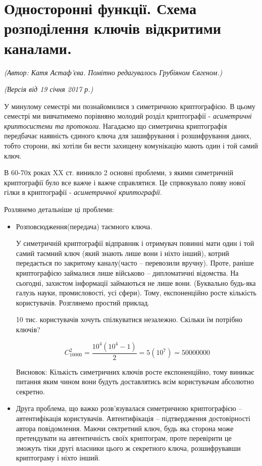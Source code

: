 \section{Односторонні функції. Схема розподілення ключів відкритими каналами.}
\begin{flushright}
\emph{(Автор: Катя Астаф'єва. Помітно редагувалось Грубіяном Євгеном.)}
\par \emph{(Версія від 19 січня 2017 р.)}
\end{flushright}

У минулому семестрі ми познайомилися з симетричною криптографією. В цьому семестрі ми вивчатимемо порівняно молодий розділ криптографії - \textit{асиметричні криптосистеми та протоколи}. Нагадаємо що симетрична криптографія передбачає наявність єдиного ключа для зашифрування і розшифрування даних, тобто сторони, які хотіли би вести захищену комунікацію мають один і той самий ключ.

В 60-70х роках XX ст. виникло 2 основні проблеми, з якими симетричній криптографії було все важче і важче справлятися. Це спрвокувало появу нової гілки в криптографії - \textit{асиметричної криптографії}. 

Розлянемо детальніше ці проблеми:
\begin{itemize}
\item Розповсюдження(передача) таємного ключа.

У симетричній криптографії відправник і отримувач повинні мати один і той самий таємний ключ (який знають лише вони і ніхто інший), котрий передається по закритому каналу(часто – перевозили вручну). Проте, раніше криптографією займалися лише військово – дипломатичні відомства. На сьогодні, захистом інформації займаються не лише вони. (Буквально будь-яка галузь науки, промисловості, усі сфери). Тому, експоненційно росте кількість користувачів. Розглянемо простий приклад.

\begin{example}
10 тис. користувачів хочуть спілкуватися незалежно. Скільки їм потрібно ключів?

\[ C_{10000}^{2} =\frac{10^4(10^4 -1)}{2} = 5(10^7) = 50000000 \]

Висновок: Кількість симетричних ключів росте експоненційно, тому виникає питання яким чином вони будуть доставлятись всім користувачам абсолютно секретно.

\end{example}

\item Друга проблема, що важко розв’язувалася симетричною криптографією – автентифікація користувачів. Автентифікація – підтвердження достовірності автора повідомлення. Маючи сектретний ключ, будь яка сторона може претендувати на автентичність своїх криптограм, проте перевірити це зможуть тіки другі власники цього ж секретного ключа, розшифрувавши криптограму і ніхто інший.

\end{itemize}

